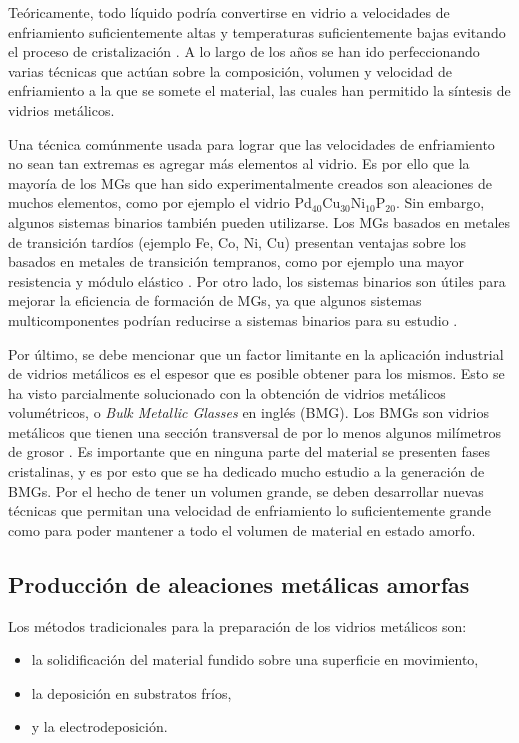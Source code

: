 Teóricamente, todo líquido podría convertirse en vidrio a velocidades de enfriamiento suficientemente altas y temperaturas suficientemente bajas evitando el proceso de cristalización \citep{turnbull61}. A lo largo de los años se han ido perfeccionando varias técnicas que actúan sobre la composición, volumen y velocidad de enfriamiento a la que se somete el material, las cuales han permitido la síntesis de vidrios metálicos.

Una técnica comúnmente usada para lograr que las velocidades de enfriamiento no sean tan extremas es agregar más elementos al vidrio. Es por ello que la mayoría de los MGs que han sido experimentalmente creados son aleaciones de muchos elementos, como por ejemplo el vidrio Pd$_{40}$Cu$_{30}$Ni$_{10}$P$_{20}$. Sin embargo, algunos sistemas binarios también pueden utilizarse. Los MGs basados en metales de transición tardíos (ejemplo Fe, Co, Ni, Cu) presentan ventajas sobre los basados en metales de transición tempranos, como por ejemplo una mayor resistencia y módulo elástico \citep{Xu04}. Por otro lado, los sistemas binarios son útiles para mejorar la eficiencia de formación de MGs, ya que algunos sistemas multicomponentes podrían reducirse a sistemas binarios para su estudio \citep{Duan05}.

Por último, se debe mencionar que un factor limitante en la aplicación industrial de vidrios metálicos es el espesor que es posible obtener para los mismos. Esto se ha visto parcialmente solucionado con la obtención de vidrios metálicos volumétricos, o \textit{Bulk Metallic Glasses} en inglés (BMG). Los BMGs son vidrios metálicos que tienen una sección transversal de por lo menos algunos milímetros de grosor \citep{suryana11}. Es importante que en ninguna parte del material se presenten fases cristalinas, y es por esto que se ha dedicado mucho estudio a la generación de BMGs. Por el hecho de tener un volumen grande, se deben desarrollar nuevas técnicas que permitan una velocidad de enfriamiento lo suficientemente grande como para poder mantener a todo el volumen de material en estado amorfo.

\subsection{Producción de aleaciones metálicas amorfas}
\label{S1_1_1}

Los métodos tradicionales para la preparación de los vidrios metálicos son:

\begin{itemize}
 \item la solidificación del material fundido sobre una superficie en movimiento,
 \item la deposición en substratos fríos,
 \item y la electrodeposición.
\end{itemize}

